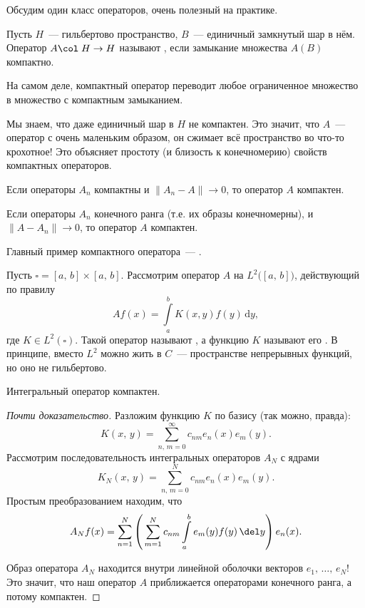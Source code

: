 \documentclass{trlnotes}
\begin{document}
    Обсудим один класс операторов, очень полезный на практике.

    \begin{de}
        Пусть $H$~--- гильбертово пространство, $B$~--- единичный замкнутый шар в нём. Оператор $A\col \; H \to H$ называют , если замыкание множества $A(B)$ компактно.
    \end{de}

    \begin{rem}
        На самом деле, компактный оператор переводит любое ограниченное множество в множество с компактным замыканием.
    \end{rem}

    Мы знаем, что даже единичный шар в $H$ не компактен. Это значит, что $A$~--- оператор с очень маленьким образом, он сжимает всё пространство во что-то крохотное! Это объясняет простоту (и близость к конечномерию) свойств компактных операторов.

    \begin{st}
        Если операторы $A_n$ компактны и $\|A_n - A\| \to 0$, то оператор $A$ компактен.
    \end{st}

    \begin{cor}
        Если операторы $A_n$ конечного ранга (т.е. их образы конечномерны), и $\|A - A_n\| \to 0$, то оператор $A$ компактен.
    \end{cor}

    Главный пример компактного оператора~--- .

    \begin{exm}
        Пусть $\square = [a, \, b] \times [a, \, b]$. Рассмотрим оператор $A$ на $L^2\big([a, \, b]\big)$, действующий по правилу
        \[
            Af(x) = \int\limits_a^b K(x, y) f(y) \, \mathrm{d}y,
        \]
        где $K \in L^2(\square)$. Такой оператор называют , а функцию $K$ называют его . В принципе, вместо $L^2$ можно жить в $C$~--- пространстве непрерывных функций, но оно не гильбертово.   
    \end{exm}

    \begin{st}
        Интегральный оператор компактен.
        \begin{proof}[Почти доказательство]
            Разложим функцию $K$ по базису (так можно, правда):
            \[
                K(x, \, y) = \sum\limits_{n, \, m = 0}^{\infty} c_{nm} e_n(x) e_m(y).
            \]
            Рассмотрим последовательность интегральных операторов $A_N$ с ядрами
            \[
                K_N(x, \, y) = \sum\limits_{n, \, m = 0}^{N} c_{nm} e_n(x) e_m(y).
            \]
            Простым преобразованием находим, что
            \[
                A_N f(x) = \sum\limits_{n = 1}^N \left(\,\sum\limits_{m = 1}^N c_{nm} \int\limits_a^b e_m(y) f(y) \, \del y\right) e_n(x).
            \]

            Образ оператора $A_N$ находится внутри линейной оболочки векторов $e_1, \, \ldots, \, e_N$! Это значит, что наш оператор $A$ приближается операторами конечного ранга, а потому компактен.
        \end{proof}
    \end{st}
\end{document}
